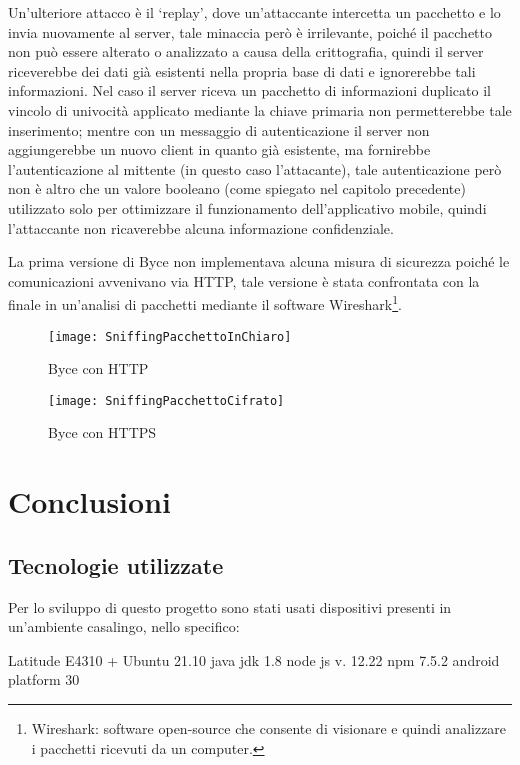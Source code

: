 \documentclass[target=bach]{thud}
\begin{document}
    Un'ulteriore attacco è il `replay', dove un'attaccante intercetta un pacchetto e lo invia nuovamente al server, tale minaccia però è irrilevante, poiché il pacchetto non può essere alterato o analizzato a causa della crittografia, quindi il server riceverebbe dei dati già esistenti nella propria base di dati e ignorerebbe tali informazioni.
    Nel caso il server riceva un pacchetto di informazioni duplicato il vincolo di univocità applicato mediante la chiave primaria non permetterebbe tale inserimento; mentre con un messaggio di autenticazione il server non aggiungerebbe un nuovo client in quanto già esistente, ma fornirebbe l'autenticazione al mittente (in questo caso l'attacante), tale autenticazione però non è altro che un valore booleano (come spiegato nel capitolo precedente) utilizzato solo per ottimizzare il funzionamento dell'applicativo mobile, quindi l'attaccante non ricaverebbe alcuna informazione confidenziale.


    La prima versione di Byce non implementava alcuna misura di sicurezza poiché le comunicazioni avvenivano via HTTP,
    tale versione è stata confrontata con la finale in un'analisi di pacchetti mediante il software Wireshark\footnote[1]{Wireshark: software open-source che consente di visionare e quindi analizzare i pacchetti ricevuti da un computer.}.

    \graphicspath{ {./img/} }
    \begin{figure}[h]
        \texttt{[image: SniffingPacchettoInChiaro]}
        \caption{Byce con HTTP}
        \label{fig:usecase}
        \centering
    \end{figure}
    \graphicspath{ {./img/} }
    \begin{figure}[h]
        \texttt{[image: SniffingPacchettoCifrato]}
        \caption{Byce con HTTPS}
        \label{fig:usecase}
        \centering
    \end{figure}



\chapter{Conclusioni}
\section{Tecnologie utilizzate}
Per lo sviluppo di questo progetto sono stati usati dispositivi presenti in un'ambiente casalingo, nello specifico:

 Latitude E4310 + Ubuntu 21.10
 java jdk 1.8
 node js v. 12.22
 npm 7.5.2
 android platform 30
\end{document}
